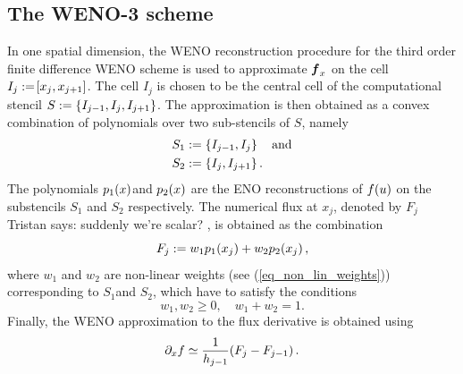 \documentclass[final]{amsart}
\renewcommand{\vect}[1]{\geovec{#1}}
\newcommand{\tristan}[1]{{\color{purple} Tristan says:  #1 }}
\numberwithin{equation}{section}
\begin{document}
\subsection{The WENO-3 scheme}
\label{subsec:WENO-3}
In one spatial dimension, the WENO reconstruction procedure for the
third order finite difference WENO scheme is used to approximate
$\vect f_x$ on the cell $I_j:=\!\left[{x_j, x_{j+1}}\right]$.  The cell $I_j$ is
chosen to be the central cell of the computational stencil
$S:=\left\lbrace I_{j-1}, I_j, I_{j+1}\right\rbrace$.  The approximation is then
obtained as a convex combination of polynomials over two sub-stencils
of $S$, namely
\begin{equation}
\begin{aligned}
S_1&:=\left\lbrace I_{j-1}, I_j\right\rbrace\quad \text{and}\\
S_2&:=\left\lbrace I_{j}, I_{j+1}\right\rbrace.
\end{aligned}
\end{equation}
The polynomials $p_1\!\left({x}\right)$and $p_2\!\left({x}\right)$ are the ENO reconstructions
of $f\!\left({u}\right)$ on the substencils $S_1$ and $S_2$ respectively.  The
numerical flux at $x_{j}$, denoted by $F_{j}$ \tristan{suddenly we're
  scalar?}, is obtained as the combination
\begin{equation}\label{eq_f_WENO}
F_{j}:=w_1p_1\!\left({x_{j}}\right) +w_2p_2\!\left({x_{j}}\right),
\end{equation}
where $w_1$ and $w_2$ are non-linear weights (see
(\ref{eq_non_lin_weights})) corresponding to $S_1$and $S_2$, which
have to satisfy the conditions
\begin{equation}
w_1, w_2\geq 0,\quad w_1 + w_2 = 1.
\end{equation}
Finally, the WENO approximation to the flux derivative is obtained using
\begin{equation}\label{eq_WENO_approx_flux_derivative}
\partial_x f\simeq \frac{1}{h_{j-1}}\!\left({F_{j}- F_{j-1}}\right).
\end{equation}
\end{document}
